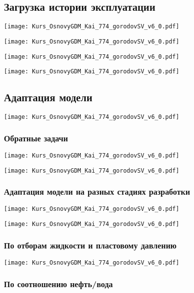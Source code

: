 \documentclass[main.tex]{subfiles}
\begin{document}
\subsection{Загрузка истории эксплуатации}

\texttt{[image: Kurs\_OsnovyGDM\_Kai\_774\_gorodovSV\_v6\_0.pdf]}

\texttt{[image: Kurs\_OsnovyGDM\_Kai\_774\_gorodovSV\_v6\_0.pdf]}

\texttt{[image: Kurs\_OsnovyGDM\_Kai\_774\_gorodovSV\_v6\_0.pdf]}

\texttt{[image: Kurs\_OsnovyGDM\_Kai\_774\_gorodovSV\_v6\_0.pdf]}

\subsection{Адаптация модели}

\texttt{[image: Kurs\_OsnovyGDM\_Kai\_774\_gorodovSV\_v6\_0.pdf]}

\subsubsection{Обратные задачи}

\texttt{[image: Kurs\_OsnovyGDM\_Kai\_774\_gorodovSV\_v6\_0.pdf]}

\texttt{[image: Kurs\_OsnovyGDM\_Kai\_774\_gorodovSV\_v6\_0.pdf]}

\subsubsection{Адаптация модели на разных стадиях разработки}

\texttt{[image: Kurs\_OsnovyGDM\_Kai\_774\_gorodovSV\_v6\_0.pdf]}

\texttt{[image: Kurs\_OsnovyGDM\_Kai\_774\_gorodovSV\_v6\_0.pdf]}

\subsubsection{По отборам жидкости и пластовому давлению}

\texttt{[image: Kurs\_OsnovyGDM\_Kai\_774\_gorodovSV\_v6\_0.pdf]}

\subsubsection{По соотношению нефть/вода}
\end{document}

